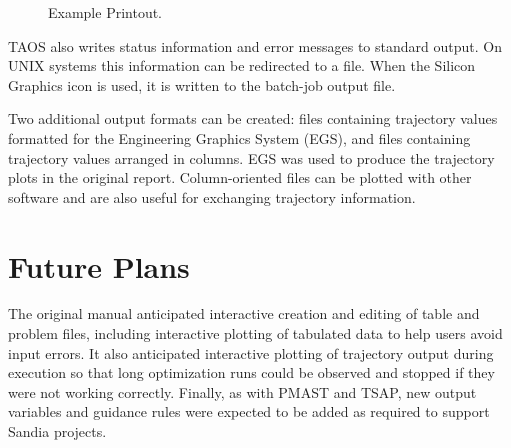 \begin{figure}[htbp]
  \centering
  
  \caption{Example Printout.}
  \label{fig:example-printout}
\end{figure}

TAOS also writes status information and error messages to standard output. On UNIX
systems this information can be redirected to a file. When the Silicon Graphics icon
is used, it is written to the batch-job output file.

Two additional output formats can be created: files containing trajectory values
formatted for the Engineering Graphics System (EGS), and files containing trajectory
values arranged in columns. EGS was used to produce the trajectory plots in the
original report. Column-oriented files can be plotted with other software and are
also useful for exchanging trajectory information.

\section{Future Plans}\label{sec:future-plans}

The original manual anticipated interactive creation and editing of table and problem
files, including interactive plotting of tabulated data to help users avoid input errors.
It also anticipated interactive plotting of trajectory output during execution so that
long optimization runs could be observed and stopped if they were not working
correctly. Finally, as with PMAST and TSAP, new output variables and guidance rules
were expected to be added as required to support Sandia projects.
